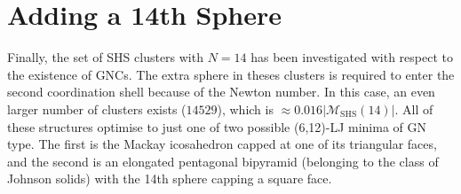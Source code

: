 \section{Adding a 14th Sphere}
\label{sec:addinga14thsphere}

Finally, the set of \ac{SHS} clusters with $N=14$ has been investigated with
respect to the existence of \acp{GNC}. The extra sphere in theses clusters is
required to enter the second coordination shell because of the Newton number. In
this case, an even larger number of clusters exists ($14529$), which is $\approx
0.016|\mathcal{M}_\mathrm{SHS}(14)|$. All of these structures optimise to just
one of two possible (6,12)-LJ minima of \ac{GN} type. The first is the Mackay
icosahedron capped at one of its triangular faces, and the second is an
elongated pentagonal bipyramid (belonging to the class of Johnson solids) with
the 14th sphere capping a square face.

